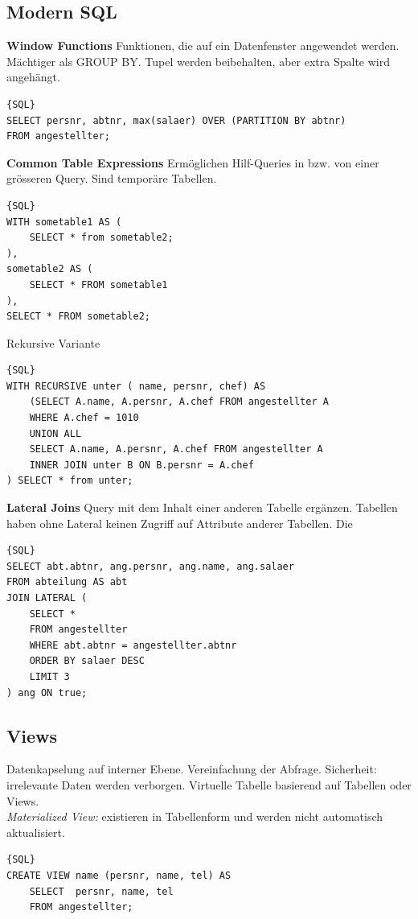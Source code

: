 \documentclass[7pt,landscape,a4paper]{scrartcl}
\begin{document}
\begin{multicols*}{4}
\subsection{Modern SQL}
\textbf{Window Functions}
Funktionen, die auf ein Datenfenster angewendet werden. Mächtiger als GROUP BY. Tupel werden beibehalten, aber extra Spalte wird angehängt.
\begin{lstlisting}{SQL}
SELECT persnr, abtnr, max(salaer) OVER (PARTITION BY abtnr) 
FROM angestellter;
\end{lstlisting}
\textbf{Common Table Expressions}
Ermöglichen Hilf-Queries in bzw. von einer grösseren Query. Sind temporäre Tabellen.
\begin{lstlisting}{SQL}
WITH sometable1 AS (
	SELECT * from sometable2;
),
sometable2 AS (
	SELECT * FROM sometable1
), 
SELECT * FROM sometable2;
\end{lstlisting}
Rekursive Variante
\begin{lstlisting}{SQL}
WITH RECURSIVE unter ( name, persnr, chef) AS
	(SELECT A.name, A.persnr, A.chef FROM angestellter A
 	WHERE A.chef = 1010
  	UNION ALL
	SELECT A.name, A.persnr, A.chef FROM angestellter A
  	INNER JOIN unter B ON B.persnr = A.chef
) SELECT * from unter;
\end{lstlisting}
\textbf{Lateral Joins}
Query mit dem Inhalt einer anderen Tabelle ergänzen. Tabellen haben ohne Lateral keinen Zugriff auf Attribute anderer Tabellen. Die 
\begin{lstlisting}{SQL}
SELECT abt.abtnr, ang.persnr, ang.name, ang.salaer
FROM abteilung AS abt
JOIN LATERAL (
	SELECT * 
	FROM angestellter
	WHERE abt.abtnr = angestellter.abtnr
	ORDER BY salaer DESC
	LIMIT 3
) ang ON true;
\end{lstlisting}
\subsection{Views}
Datenkapselung auf interner Ebene. Vereinfachung der Abfrage. 
Sicherheit: irrelevante Daten werden verborgen. Virtuelle Tabelle basierend auf Tabellen oder Views. \\\textit{Materialized View:} existieren in Tabellenform und werden nicht automatisch aktualisiert.
\begin{lstlisting}{SQL}
CREATE VIEW name (persnr, name, tel) AS
	SELECT	persnr, name, tel 
	FROM angestellter;
\end{lstlisting}

\end{multicols*}
\end{document}
